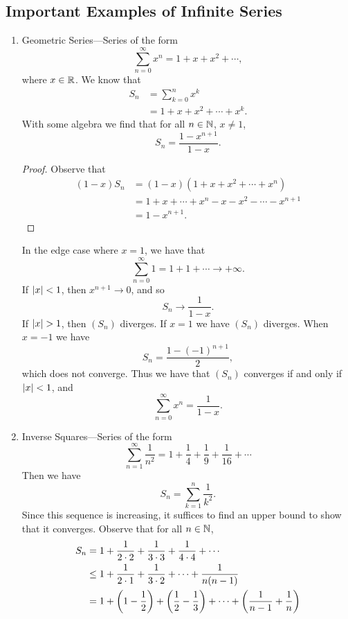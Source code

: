 \documentclass[class=article, crop=false]{standalone}
\begin{document}
  \subsection{Important Examples of Infinite Series}
  \begin{enumerate}[label=\arabic*)]
    \item Geometric Series---Series of the form
    \[
      \sum_{n=0}^{\infty}x^n = 1 + x + x^2 + \dotsb,
    \]
    where $x\in\mathbb{R}$. We know that
    \begin{align*}
      S_n &= \sum_{k=0}^{n}x^k \\
          &= 1 + x + x^2 + \dotsb + x^k.
    \end{align*}
    With some algebra we find that for all $n\in\mathbb{N}$, $x\neq 1$,
    \[
      S_n = \frac{1-x^{n + 1}}{1 - x}.
    \]
    \begin{proof}
      Observe that
      \begin{align*}
        (1 - x) S_n &= (1 - x)(1 + x + x^2 + \dotsb + x^n) \\
                    &= 1 + x + \dotsb + x^n - x - x^2 - \dotsb - x^{n + 1} \\
                    &= 1 - x^{n + 1}.
      \end{align*}
    \end{proof}
    In the edge case where $x = 1$, we have that
    \[
      \sum_{n=0}^{\infty}1 = 1 + 1 + \dotsb \to+\infty.
    \]
    If $\left\lvert x \right\rvert < 1$, then $x^{n + 1}\to 0$, and so
    \[
      S_n\to \frac{1}{1 - x}.
    \]
    If $\left\lvert x \right\rvert > 1$, then $(S_n)$ diverges. If $x = 1$ we have $(S_n)$ diverges. When $x = -1$ we have
    \[
      S_n = \frac{1-(-1)^{n + 1}}{2},
    \]
    which does not converge. Thus we have that $(S_n)$ converges if and only if $\left\lvert x \right\rvert < 1$, and
    \[
      \sum_{n=0}^{\infty}x^n = \frac{1}{1 - x}.
    \]
    \item Inverse Squares---Series of the form
    \[
      \sum_{n=1}^{\infty} \frac{1}{n^2} = 1 + \frac{1}{4} + \frac{1}{9} + \frac{1}{16} + \dotsb
    \]
    Then we have
    \[
      S_n = \sum_{k=1}^{n} \frac{1}{k^2}.
    \]
    Since this sequence is increasing, it suffices to find an upper bound to show that it converges. Observe that for all $n\in\mathbb{N}$,
    \begin{align*}
      S_n &= 1 + \frac{1}{2\cdot 2} + \frac{1}{3\cdot 3} + \frac{1}{4\cdot 4} + \dotsb \\
          &\leq 1 + \frac{1}{2\cdot 1} + \frac{1}{3\cdot 2} + \dotsb + \frac{1}{n(n - 1)} \\
          &= 1 + \paren{1 - \frac{1}{2}} + \paren{\frac{1}{2} - \frac{1}{3}} + \dotsb + \paren{\frac{1}{n - 1} + \frac{1}{n}} \\

\end{align*}
\end{enumerate}
\end{document}
